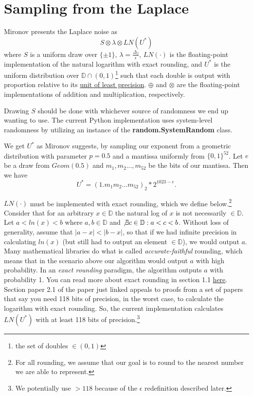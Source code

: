 \documentclass[11pt]{scrartcl} %
\begin{document}
\section{Sampling from the Laplace}
Mironov presents the Laplace noise as
\[ S \otimes \lambda \otimes LN(U^*) \]
where $S$ is a uniform draw over $\{\pm 1\}$, $\lambda = \frac{\Delta_f}{\epsilon}$, $LN(\cdot)$ is the floating-point implementation of the natural logarithm with exact rounding, and $U^*$ is the uniform distribution over $\mathbb{D} \cap (0,1)$\footnote{the set of doubles $\in (0,1)$} such that each double is output with proportion relative to its \href{https://en.wikipedia.org/wiki/Unit_in_the_last_place}{unit of least precision}. $\oplus$ and $\otimes$ are the floating-point implementations of addition and multiplication, respectively. \newline

Drawing $S$ should be done with whichever source of randomness we end up wanting to use. The current Python implementation uses system-level randomness by utilizing an instance of the \textbf{random.SystemRandom} class. \newline

We get $U^*$ as Mironov suggests, by sampling our exponent from a geometric distribution with parameter $p = 0.5$ and a mantissa uniformly from $\{0,1\}^{52}$. Let $e$ be a draw from $Geom(0.5)$ and $m_1, m_2 \hdots, m_{52}$ be the bits of our mantissa. Then we have
\[ U^{*} = (1.m_1m_2 \hdots m_{52})_2 * 2^{1023 - e}. \]

$LN(\cdot)$ must be implemented with exact rounding, which we define below.\footnote{For all rounding, we assume that our goal is to round to the nearest number we are able to represent.} Consider that for an arbitrary $x \in \mathbb{D}$ the natural log of $x$ is not necessarily $\in \mathbb{D}$. Let $a < ln(x) < b$ where $a,b \in \mathbb{D}$ and $\not\exists c \in \mathbb{D}: a < c < b$. Without loss of generality, assume that $\vert a-x \vert < \vert b - x \vert$, so that if we had infinite precision in calculating $ln(x)$ (but still had to output an element $\in \mathbb{D}$), we would output $a$.
Many mathematical libraries do what is called \textit{accurate-faithful} rounding, which means that in the scenario above our algorithm would output $a$ with high probability. In an \textit{exact rounding} paradigm, the algorithm outputs $a$ with probability 1. You can read more about exact rounding in section 1.1 \href{http://www.ens-lyon.fr/LIP/Pub/Rapports/RR/RR2005/RR2005-37.pdf}{here}. Section paper 2.1 of the paper just linked appeals to proofs from a set of papers that say you need 118 bits of precision, in the worst case, to calculate the logarithm with exact rounding. So, the current implementation calculates $LN(U^*)$ with at least 118 bits of precision.\footnote{We potentially use $> 118$ because of the $\epsilon$ redefinition described later.} \newline
\end{document}

